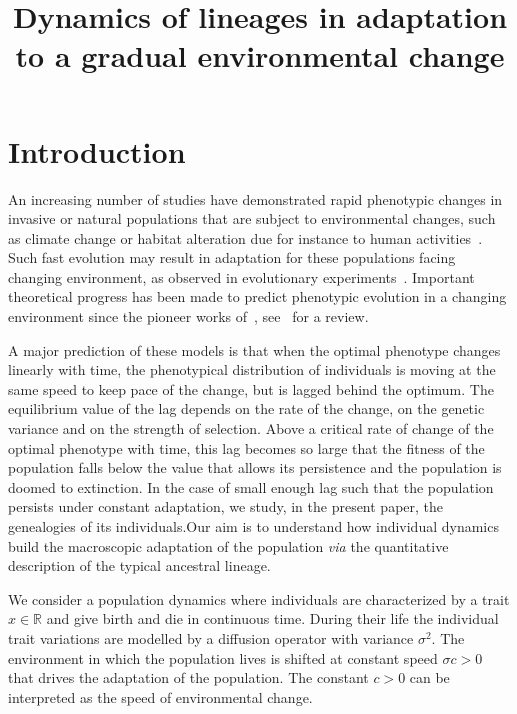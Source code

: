 \documentclass[AHL,Unicode,longabstracts,published]{cedram}
\title[Dynamics of lineages in environmental change]{Dynamics of lineages in adaptation to a gradual environmental change}
\author[\initial{V.} \lastname{Calvez}]{\firstname{Vincent} \lastname{Calvez}}
\author[\initial{B.} \lastname{Henry}]{\firstname{Beno\^it} \lastname{Henry}}
\author[\initial{S.} \lastname{Méléard}]{\firstname{Sylvie} \lastname{Méléard}}
\author[\initial{V.C.} \lastname{Tran}]{\firstname{Viet~Chi} \lastname{Tran}}
\newcommand*\R{\mathbb{R}}
\begin{document}
\maketitle



\section{Introduction}

An increasing number of studies have demonstrated rapid phenotypic changes in invasive or natural populations that are subject to environmental changes, such as climate change or habitat alteration due for instance to human activities~\cite{anderson_evolutionary_2012,BraHol06,burrows_pace_2011,Hen08,HofSgr11,Par06,sheldon_climate_2019}. Such fast evolution may result in adaptation for these populations facing changing environment, as observed in evolutionary experiments~\cite{Col18,GorAarZwa16,guzella_slower_2018,Gon13}. Important theoretical progress has been made to predict phenotypic evolution in a changing environment since the pioneer works of~\cite{BurLyn95,LynGabWoo91,LynLan93,LanSha96}, see~\cite{KopMat13} for a review.



A major prediction of these models is that when the optimal phenotype changes linearly with time, the phenotypical distribution of individuals is moving at the same speed to keep pace of the change, but is lagged behind the optimum. The equi\-librium value of the lag depends on the rate of the change, on the genetic variance and on the strength of selection. Above a critical rate of change of the optimal phenotype with time, this lag becomes so large that the fitness of the population falls below the value that allows its persistence and the population is doomed to extinction. In the case of small enough lag such that the population persists under constant adaptation, we study, in the present paper, the genealogies of its individuals.\linebreak Our aim is to understand how individual dynamics build the macroscopic adaptation of the population \emph{via} the quantitative description of the typical ancestral lineage.



We consider a population dynamics where individuals are characterized by a trait $x\in \R$ and give birth and die in continuous time. During their life the individual trait variations are modelled by a diffusion operator with variance $\sigma^2$. The environment in which the population lives is shifted at constant speed $\sigma c>0$ that drives the adaptation of the population. The constant $c>0$ can be interpreted as the speed of environmental change.
\end{document}

